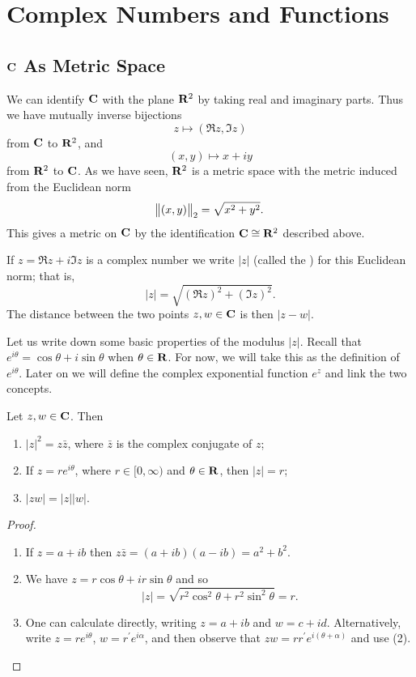 \chapter{Complex Numbers and Functions}\label{chap:complex-functions}
\section{$\mathbf C$ As Metric Space}
We can identify $\mathbf C$ with the plane $\mathbf R^2$ by taking
real and imaginary parts. Thus we have mutually inverse bijections
\[z\mapsto(\Re z,\Im z)\]
from $\mathbf C$ to $\mathbf R^2$, and
\[(x,y)\mapsto x+iy\]
from $\mathbf R^2$ to $\mathbf C$. As we have seen, $\mathbf R^2$ is a metric space with the metric induced from the Euclidean norm
\[\norm{(x,y)}_2=\sqrt{x^2+y^2}.\]
This gives a metric on $\mathbf C$ by the identification $\mathbf C\cong\mathbf R^2$ described above.

If $z=\Re z+i\Im z$ is a complex number we write $|z|$ (called the ) for this Euclidean norm; that is,
\[|z|=\sqrt{(\Re z)^2+(\Im z)^2}.\]
The distance between the two points $z,w\in\mathbf C$ is then $|z-w|$.

Let us write down some basic properties of the modulus $|z|$. Recall that $e^{i\theta}=\cos\theta+i\sin\theta$ when $\theta\in\mathbf R$. For now, we will take this as the definition of $e^{i\theta}$. Later on we will define the complex exponential function $e^z$ and link the two concepts.

\begin{lemma}
Let $z,w\in\mathbf C$. Then
\begin{enumerate}[label=(\roman*)]
\item $|z|^2=z\bar{z}$, where $\bar{z}$ is the complex conjugate of $z$;
\item If $z=re^{i\theta}$, where $r\in[0,\infty)$ and $\theta\in\mathbf R$, then $|z|=r$;
\item $|zw| = |z||w|$.
\end{enumerate}
\end{lemma}

\begin{proof} \
\begin{enumerate}[label=(\roman*)]
\item If $z=a+ib$ then $z\bar{z}=(a+ib)(a-ib)=a^2+b^2$.
\item We have $z=r\cos\theta+ir\sin\theta$ and so
\[|z|=\sqrt{r^2\cos^2\theta+r^2\sin^2\theta}=r.\]
\item One can calculate directly, writing $z=a+ib$ and $w=c+id$. Alternatively, write $z=re^{i\theta}$, $w=r^\prime e^{i\alpha}$, and then observe that $zw=rr^\prime e^{i(\theta+\alpha)}$ and use (2).
\end{enumerate}
\end{proof}

